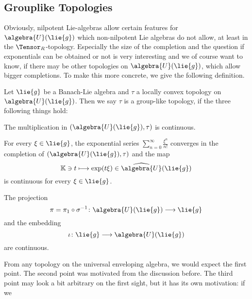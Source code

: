 \documentclass[
11pt,                          %
english                        %
]{article}
\begin{document}
\subsection{Grouplike Topologies}
Obviously, nilpotent Lie-algebras allow certain features for $\algebra{U}(\lie{g})$ which non-nilpotent Lie algebras do not allow, at least in the $\Tensor_R$-topology. Especially the size of the completion and the question if exponentials can be obtained or not is very interesting and we of course want to know, if there may be other topologies on $\algebra{U}(\lie{g})$, which allow bigger completions. To make this more concrete, we give the following definition.
\begin{definition}
	\label{def:grouplike-topology}
	Let $\lie{g}$ be a Banach-Lie algebra and $\tau$ a locally convex topology on 
	$\algebra{U}(\lie{g})$. Then we say $\tau$ is a group-like topology, if the 
	three following things hold:
	\begin{definitionlist}
		\item
		The multiplication in $(\algebra{U}(\lie{g}), \tau)$ is continuous.
		
		\item
		For every $\xi \in \lie{g}$, the exponential series $\sum_{n=0}^\infty 
		\frac{\xi^n}{n!}$ converges in the completion of $(\algebra{U}(\lie{g}), 
		\tau)$ and the map
		\begin{equation}
			\label{eq:exp-is-continuous}
			\mathbb{K} \ni t
			\longmapsto
			\exp(t \xi)
			\in \widehat{\algebra{U}}(\lie{g})
		\end{equation}
		is continuous for every $\xi \in \lie{g}$.
		
		\item
		The projection 
		\begin{equation}
			\label{eq:projection}
			\pi 
			= 
			\pi_1 \circ \sigma^{-1}
			\colon
			\algebra{U}(\lie{g})
			\longrightarrow
			\lie{g}
		\end{equation}
		and the embedding
		\begin{equation}
			\label{eq:embedding} 
			\iota \colon \lie{g} \longrightarrow \algebra{U}(\lie{g})
		\end{equation}	
		are continuous.
	\end{definitionlist}
\end{definition}
From any topology on the universal enveloping algebra, we would expect the first 
point. The second point was motivated from the discussion before. The third point 
may look a bit arbitrary on the first sight, but it has its own motivation: if we 
\end{document}
